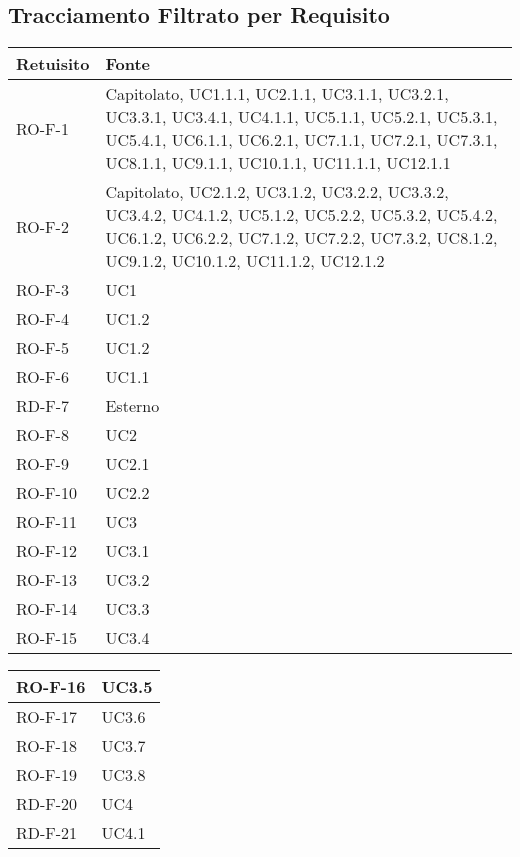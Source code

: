 \subsection{Tracciamento Filtrato per Requisito}
\begin{center}
\renewcommand{\arraystretch}{1.8} %
\begin{tabular}{ |m{8em}|m{13em}| }
    \hline
    \textbf{Retuisito} & \textbf{Fonte} \\
    \hline
    RO-F-1  &   Capitolato, UC1.1.1, UC2.1.1, UC3.1.1, UC3.2.1, UC3.3.1, UC3.4.1, UC4.1.1, UC5.1.1, UC5.2.1, UC5.3.1, UC5.4.1, UC6.1.1, UC6.2.1, UC7.1.1, UC7.2.1, UC7.3.1, UC8.1.1, UC9.1.1, UC10.1.1, UC11.1.1, UC12.1.1 \\
    \hline
    RO-F-2  &   Capitolato, UC2.1.2, UC3.1.2, UC3.2.2, UC3.3.2, UC3.4.2, UC4.1.2, UC5.1.2, UC5.2.2, UC5.3.2, UC5.4.2, UC6.1.2, UC6.2.2, UC7.1.2, UC7.2.2, UC7.3.2, UC8.1.2, UC9.1.2, UC10.1.2, UC11.1.2, UC12.1.2 \\
    \hline
    RO-F-3  &   UC1 \\
    \hline
    RO-F-4  &   UC1.2 \\
    \hline
    RO-F-5  &   UC1.2 \\
    \hline
    RO-F-6  &   UC1.1 \\
    \hline
    RD-F-7  &   Esterno \\
    \hline
    RO-F-8  &   UC2 \\
    \hline
    RO-F-9  &   UC2.1 \\
    \hline
    RO-F-10  &  UC2.2 \\
    \hline
    RO-F-11  &  UC3 \\
    \hline
    RO-F-12  &  UC3.1 \\
    \hline
    RO-F-13  &  UC3.2 \\
    \hline
    RO-F-14  &  UC3.3 \\
    \hline
    RO-F-15  &  UC3.4 \\
    \hline
    \end{tabular}
    \newpage
    \begin{tabular}{ |m{8em}|m{13em}| }
    \hline
    RO-F-16  &  UC3.5 \\
    \hline
    RO-F-17  &  UC3.6 \\
    \hline
    RO-F-18  &  UC3.7 \\
    \hline
    RO-F-19  &  UC3.8 \\
    \hline
    RD-F-20  &  UC4 \\
    \hline
    RD-F-21  &  UC4.1 \\

\end{tabular}
\end{center}
